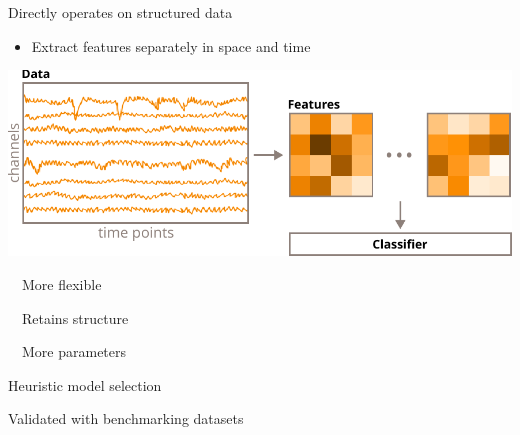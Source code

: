 \documentclass{kul-ulille-beamer}
\begin{document}
\begin{frame}
\begin{minipage}[t]{.35\linewidth}
    \raggedright\small
    Directly operates on structured data
    \begin{itemize}
      \item Extract features separately in space and time
    \end{itemize}
    {\tiny\cite{Phan2010}}
	\end{minipage}\hfill%
  \vrule\hfill%
  \begin{minipage}[t]{.5\textwidth}
    \centering
    \includegraphics[width=\textwidth]{figures/decode/bttda.pdf}
    \bigskip

    \small
    \begin{minipage}[t]{.45\textwidth}
      \posi\ \ More flexible
      \smallskip

      \posi\ \ Retains structure
      \smallskip

      {\tiny\cite{VanDenKerchovesubmitted}}
    \end{minipage}\hfill%
    \begin{minipage}[t]{.5\textwidth}
      \raggedright
      \nega\ \ More parameters
      \smallskip

      \ergo Heuristic model selection
    \end{minipage}
      \bigskip

      Validated with benchmarking datasets
  \end{minipage}

\end{frame}
\end{document}
